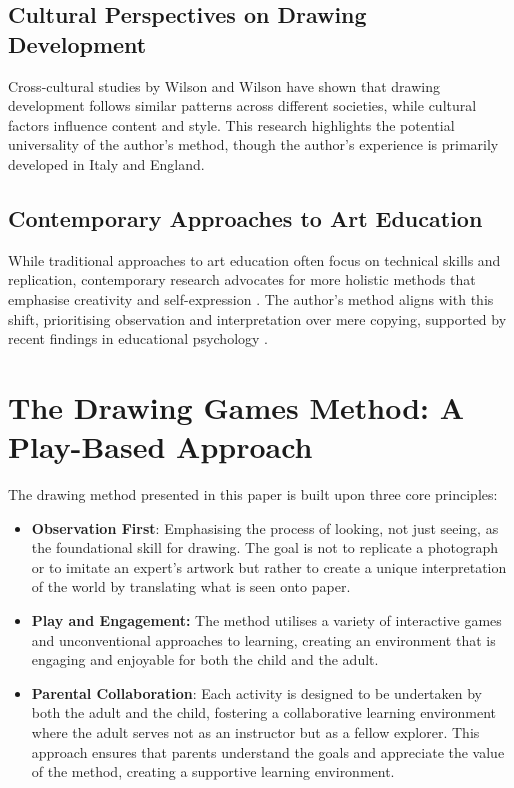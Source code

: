 \documentclass{article}
\begin{document}
\subsection{Cultural Perspectives on Drawing Development}

Cross-cultural studies by Wilson and Wilson \cite{13wilson1982teaching} have shown that drawing development follows similar patterns across different societies, while cultural factors influence content and style. This research highlights the potential universality of the author's method, though the author's experience is primarily developed in Italy and England.

\subsection{Contemporary Approaches to Art Education}

While traditional approaches to art education often focus on technical skills and replication, contemporary research advocates for more holistic methods that emphasise creativity and self-expression \cite{14sheridan2022studio}. The author's method aligns with this shift, prioritising observation and interpretation over mere copying, supported by recent findings in educational psychology \cite{15gardner1990art}.



\section{The Drawing Games Method: A Play-Based Approach}
\label{sec:others}


The drawing method presented in this paper is built upon three core principles:

\begin{itemize}
    \item \textbf{Observation First}: Emphasising the process of looking, not just seeing, as the foundational skill for drawing. The goal is not to replicate a photograph or to imitate an expert's artwork but rather to create a unique interpretation of the world by translating what is seen onto paper.
    \item \textbf{Play and Engagement:} The method utilises a variety of interactive games and unconventional approaches to learning, creating an environment that is engaging and enjoyable for both the child and the adult.
    \item \textbf{Parental Collaboration}: Each activity is designed to be undertaken by both the adult and the child, fostering a collaborative learning environment where the adult serves not as an instructor but as a fellow explorer. This approach ensures that parents understand the goals and appreciate the value of the method, creating a supportive learning environment.
\end{itemize}
\end{document}
